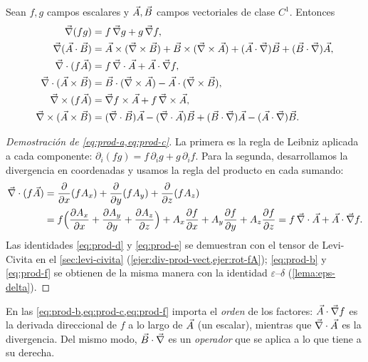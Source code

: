 \begin{proposicion}\label{prop:productos}
Sean $f,g$ campos escalares y $\vec{A},\vec{B}$ campos vectoriales de clase
$C^{1}$. Entonces
\begin{align}
  \vec{\nabla}(fg)&=f\,\vec{\nabla} g+g\,\vec{\nabla} f, \label{eq:prod-a}\\
  \vec{\nabla}(\vec{A}\cdot\vec{B})&=\vec{A}\times(\vec{\nabla}\times\vec{B})+\vec{B}\times(\vec{\nabla}\times\vec{A})
     +(\vec{A}\cdot\vec{\nabla})\vec{B}+(\vec{B}\cdot\vec{\nabla})\vec{A}, \label{eq:prod-b}\\
  \vec{\nabla}\cdot(f\vec{A})&=f\,\vec{\nabla}\cdot\vec{A}+\vec{A}\cdot\vec{\nabla} f, \label{eq:prod-c}\\
  \vec{\nabla}\cdot(\vec{A}\times\vec{B})&=\vec{B}\cdot(\vec{\nabla}\times\vec{A})-\vec{A}\cdot(\vec{\nabla}\times\vec{B}), \label{eq:prod-d}\\
  \vec{\nabla}\times(f\vec{A})&=\vec{\nabla} f\times\vec{A}+f\,\vec{\nabla}\times\vec{A}, \label{eq:prod-e}\\
  \vec{\nabla}\times(\vec{A}\times\vec{B})&=(\vec{\nabla}\cdot\vec{B})\vec{A}-(\vec{\nabla}\cdot\vec{A})\vec{B}
     +(\vec{B}\cdot\vec{\nabla})\vec{A}-(\vec{A}\cdot\vec{\nabla})\vec{B}. \label{eq:prod-f}
\end{align}
\end{proposicion}
\begin{proof}[Demostración de \cref{eq:prod-a,eq:prod-c}]
La primera es la regla de Leibniz aplicada a cada componente: $\partial_i(fg)=f\,\partial_ig+g\,\partial_if$.
Para la segunda, desarrollamos la divergencia en coordenadas y usamos la regla
del producto en cada sumando:
\begin{align*}
  \vec{\nabla}\cdot(f\vec{A})&=\frac{\partial }{\partial x}(fA_x)+\frac{\partial }{\partial y}(fA_y)+\frac{\partial }{\partial z}(fA_z)\\
  &=f\Bigl(\frac{\partial A_x}{\partial x}+\frac{\partial A_y}{\partial y}+\frac{\partial A_z}{\partial z}\Bigr)
   +A_x\frac{\partial f}{\partial x}+A_y\frac{\partial f}{\partial y}+A_z\frac{\partial f}{\partial z}
   =f\,\vec{\nabla}\cdot\vec{A}+\vec{A}\cdot\vec{\nabla} f.
\end{align*}
Las identidades \eqref{eq:prod-d} y \eqref{eq:prod-e} se demuestran con el tensor de
Levi-Civita en el \cref{sec:levi-civita}
(\cref{ejer:div-prod-vect,ejer:rot-fA}); \eqref{eq:prod-b} y \eqref{eq:prod-f} se
obtienen de la misma manera con la identidad $\varepsilon$--$\delta$
(\cref{lema:eps-delta}).
\end{proof}

\begin{observacion}\label{obs:orden}
En las \cref{eq:prod-b,eq:prod-c,eq:prod-f} importa el \emph{orden} de los factores:
$\vec{A}\cdot\vec{\nabla} f$ es la derivada direccional de $f$ a lo largo de $\vec{A}$ (un
escalar), mientras que $\vec{\nabla}\cdot\vec{A}$ es la divergencia. Del mismo modo,
$\vec{B}\cdot\vec{\nabla}$ es un \emph{operador} que se aplica a lo que tiene a su
derecha.
\end{observacion}

